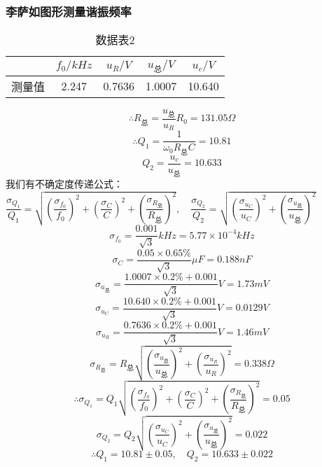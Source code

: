 \documentclass[a4 paper,12pt]{article}
\begin{document}
\subsubsection{李萨如图形测量谐振频率}
\begin{table}[H]
	\centering
	\caption{数据表2}
	\label{数据表2}
	\begin{tabular}{c|*{4}{c}}
		\toprule[0.5mm]
		&$f_{0}/kHz$&$u_{R}/V$&$u_{\text{总}}/V$&$u_{c}/V$\\
		\midrule
		测量值&2.247&0.7636&1.0007&10.640\\
		\bottomrule[0.5mm]
	\end{tabular}
\end{table}
$$\therefore R_{\text{总}}=\dfrac{u_{\text{总}}}{u_{R}}R_{0}=131.05\Omega$$
$$\therefore Q_{1}=\dfrac{1}{\omega_{0}R_{\text{总}}C}=10.81$$
$$Q_{2}=\dfrac{u_{c}}{u_{\text{总}}}=10.633$$
我们有不确定度传递公式：$\dfrac{\sigma_{Q_{1}}}{Q_{1}}=\sqrt{(\dfrac{\sigma_{f_{0}}}{f_{0}})^{2}+(\dfrac{\sigma_{C}}{C})^{2}+(\dfrac{\sigma_{R_{\text{总}}}}{R_{\text{总}}})^{2}},\quad \dfrac{\sigma_{Q_{2}}}{Q_{2}}=\sqrt{(\dfrac{\sigma_{u_{C}}}{u_{C}})^{2}+(\dfrac{\sigma_{u_{\text{总}}}}{u_{\text{总}}})^{2}}$\\
$$\sigma_{f_{0}}=\dfrac{0.001}{\sqrt{3}}kHz=5.77\times10^{-4}kHz$$
$$\sigma_{C}=\dfrac{0.05\times 0.65\%}{\sqrt{3}}\mu F=0.188nF $$
$$\sigma_{u_{\text{总}}}=\dfrac{1.0007\times 0.2\%+0.001}{\sqrt{3}}V=1.73mV$$
$$\sigma_{u_{C}}=\dfrac{10.640\times 0.2\%+0.001}{\sqrt{3}}V=0.0129V$$
$$\sigma_{u_{R}}=\dfrac{0.7636\times 0.2\%+0.001}{\sqrt{3}}V=1.46mV$$
$$\sigma_{R_{\text{总}}}=R_{\text{总}}\sqrt{(\dfrac{\sigma_{u_{\text{总}}}}{u_{\text{总}}})^{2}+(\dfrac{\sigma_{u_{R}}}{u_{R}})^{2}}=0.338\Omega$$
$$\therefore \sigma_{Q_{1}}=Q_{1}\sqrt{(\dfrac{\sigma_{f_{0}}}{f_{0}})^{2}+(\dfrac{\sigma_{C}}{C})^{2}+(\dfrac{\sigma_{R_{\text{总}}}}{R_{\text{总}}})^{2}}=0.05$$
$$\sigma_{Q_{2}}=Q_{2}\sqrt{(\dfrac{\sigma_{u_{C}}}{u_{C}})^{2}+(\dfrac{\sigma_{u_{\text{总}}}}{u_{\text{总}}})^{2}}=0.022$$
$$\therefore Q_{1}=10.81\pm0.05,\quad Q_{2}=10.633\pm0.022$$
\end{document}
